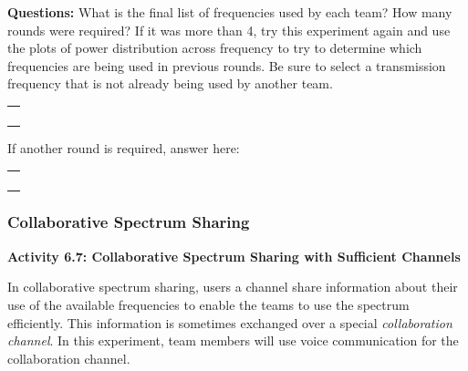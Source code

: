 \documentclass[11pt]{article}
\begin{document}
\textbf{Questions:} What is the final list of frequencies used by each
team? How many rounds were required? If it was more than 4, try this
experiment again and use the plots of power distribution across
frequency to try to determine which frequencies are being used in
previous rounds. Be sure to select a transmission frequency that is not
already being used by another team.

\begin{longtable}[]{@{}l@{}}
\toprule
 \\
\midrule
\endhead
 \\
 \\
 \\
 \\
\bottomrule
\end{longtable}

If another round is required, answer here:

\begin{longtable}[]{@{}l@{}}
\toprule
 \\
\midrule
\endhead
 \\
 \\
 \\
 \\
\bottomrule
\end{longtable}

    \hypertarget{collaborative-spectrum-sharing}{%
\subsubsection*{Collaborative Spectrum
Sharing}\label{collaborative-spectrum-sharing}}

\textbf{Activity 6.7: Collaborative Spectrum Sharing with Sufficient
Channels}

In collaborative spectrum sharing, users a channel share information
about their use of the available frequencies to enable the teams to use
the spectrum efficiently. This information is sometimes exchanged over a
special \emph{collaboration channel}. In this experiment, team members
will use voice communication for the collaboration channel.
\end{document}
